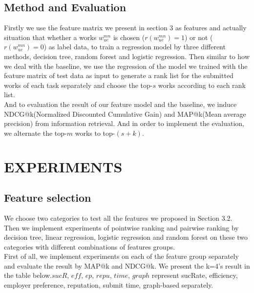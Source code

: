 \documentclass{sig-alternate-05-2015}
\begin{document}
\subsection{Method and Evaluation}
Firstly we use the feature matrix we present in section 3 as features and actually situation that whether a works ${w}_{ue}^{mn}$ is chosen ($r({w}_{ue}^{mn})=1$) or not ($r({w}_{ue}^{mn})=0$) as label data, to train a regression model by three different methods, decision tree, random forest and logistic regression. Then similar to how we deal with the baseline, we use the regression of the model we trained with the feature matrix of test data as input to generate a rank list for the submitted works of each task separately and choose the top-$s$ works according to each rank list.\\

And to evaluation the result of our feature model and the baseline, we induce NDCG@k(Normalized Discounted Cumulative Gain) and MAP@k(Mean average precision) from information retrieval. And in order to implement the evaluation, we alternate the top-$m$ works to top-$(s+k)$.

\section{EXPERIMENTS}
\subsection{Feature selection}
We choose two categories to test all the features we proposed in Section 3.2. Then we implement experiments of pointwise ranking and pairwise ranking by decision tree, linear regression, logistic regression and random forest on these two categories with different combinations of features groups. \\
First of all, we implement experiments on each of the feature group separately and evaluate the result by MAP@k and NDCG@k. We present the k=4's result in the table below.$sucR$, $eff$, $ep$, $repu$, $time$, $graph$ represent sucRate, efficiency, employer preference, reputation, submit time, graph-based separately. \\
\end{document}
